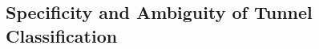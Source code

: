 \documentclass{llncs}
\begin{document}
%
%
%


\subsection{Specificity and Ambiguity of Tunnel Classification}
\label{detection-perf-cert}
\end{document}
